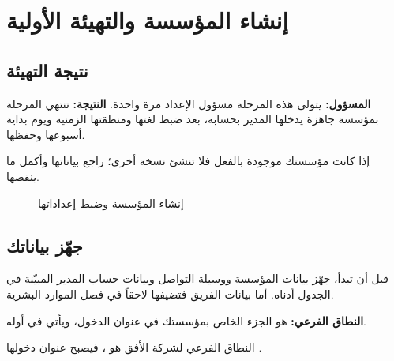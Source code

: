 \chapter{إنشاء المؤسسة والتهيئة الأولية}
\label{ch:org-setup}

\section{نتيجة التهيئة}
\label{sec:setup-minute}

\textbf{المسؤول:} يتولى هذه المرحلة مسؤول الإعداد مرة واحدة. \textbf{النتيجة:} تنتهي المرحلة بمؤسسة جاهزة يدخلها المدير بحسابه، بعد ضبط لغتها ومنطقتها الزمنية ويوم بداية أسبوعها وحفظها.

إذا كانت مؤسستك موجودة بالفعل فلا تنشئ نسخة أخرى؛ راجع بياناتها وأكمل ما ينقصها.

\begin{figure}[H]
\centering
{}
\rclegend
\caption{إنشاء المؤسسة وضبط إعداداتها}
\label{fig:setup-steps}
\end{figure}

\section{جهّز بياناتك}
\label{sec:setup-before}

قبل أن تبدأ، جهّز بيانات المؤسسة ووسيلة التواصل وبيانات حساب المدير المبيّنة في الجدول أدناه. أما بيانات الفريق فتضيفها لاحقاً في فصل الموارد البشرية.

\textbf{النطاق الفرعي:} هو الجزء الخاص بمؤسستك في عنوان الدخول، ويأتي في أوله.

\begin{rcnote}
النطاق الفرعي لشركة الأفق هو ، فيصبح عنوان دخولها .
\end{rcnote}

